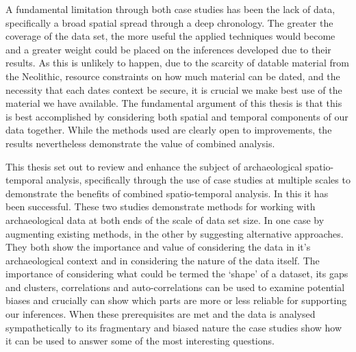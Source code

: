 A fundamental limitation through both case studies has been the lack of data, specifically a broad spatial spread through a deep chronology. The greater the coverage of the data set, the more useful the applied techniques would become and a greater weight could be placed on the inferences developed due to their results. As this is unlikely to happen, due to the scarcity of datable material from the Neolithic, resource constraints on how much material can be dated, and the necessity that each dates context be secure, it is crucial we make best use of the material we have available. The fundamental argument of this thesis is that this is best accomplished by considering both spatial and temporal components of our data together. While the methods used are clearly open to improvements, the results nevertheless demonstrate the value of combined analysis.

This thesis set out to review and enhance the subject of archaeological spatio-temporal analysis, specifically through the use of case studies at multiple scales to demonstrate the benefits of combined spatio-temporal analysis. In this it has been successful. These two studies demonstrate methods for working with archaeological data at both ends of the scale of data set size. In one case by augmenting existing methods, in the other by suggesting alternative approaches. They both show the importance and value of considering the data in it's archaeological context and in considering the nature of the data itself. The importance of considering what could be termed the `shape' of a dataset, its gaps and clusters, correlations and auto-correlations can be used to examine potential biases and crucially can show which parts are more or less reliable for supporting our inferences. When these prerequisites are met and the data is analysed sympathetically to its fragmentary and biased nature the case studies show how it can be used to answer some of the most interesting questions.

